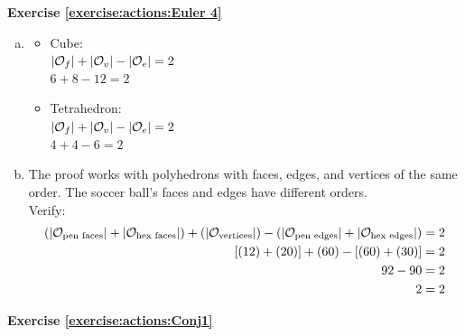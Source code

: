  
\noindent\textbf{Exercise \ref{exercise:actions:Euler 4}}
\begin{enumerate}[(a)]
\item 
	\begin{itemize}
	\item
	Cube:
	\\
	$|{\cal O}_f| + |{\cal O}_v| - |{\cal O}_e| = 2$
	\\
	$6 + 8 -12 = 2$
	
	\item
	Tetrahedron:
	\\
	$|{\cal O}_f| + |{\cal O}_v| - |{\cal O}_e| = 2$
	\\
	$4 + 4 - 6 = 2$
	\end{itemize}
	
\item 
The proof works with polyhedrons with faces, edges, and vertices of the same order.  The soccer ball's faces and edges have different orders.
\\
Verify:
\begin{align*}
(|{\cal O}_{\text{pen faces}}| + |{\cal O}_{\text{hex faces}}|) +  (|{\cal O}_{\text{vertices}}|)  -  (|{\cal O}_{\text{pen edges}}| + |{\cal O}_{\text{hex edges}}|) &= 2 
\\
[(12) + (20)] + (60) - [(60) + (30)] &= 2 
\\
92 - 90 &= 2
\\
2 &= 2 
\end{align*}
\end{enumerate}
 
\noindent\textbf{Exercise \ref{exercise:actions:Conj1}}

